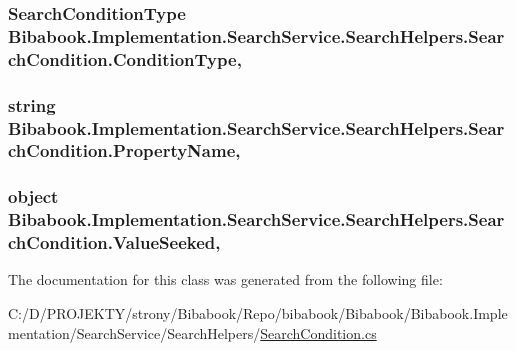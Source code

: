 \subsubsection[{Condition\+Type}]{\setlength{\rightskip}{0pt plus 5cm}Search\+Condition\+Type Bibabook.\+Implementation.\+Search\+Service.\+Search\+Helpers.\+Search\+Condition.\+Condition\+Type\hspace{0.3cm}{\ttfamily [get]}, {\ttfamily [set]}}\label{class_bibabook_1_1_implementation_1_1_search_service_1_1_search_helpers_1_1_search_condition_ad687a38f2ac1b652ba4f621fa3bbd983}
\hypertarget{class_bibabook_1_1_implementation_1_1_search_service_1_1_search_helpers_1_1_search_condition_a27ffc146a7b383bc22fddd9038b19535}{}
\subsubsection[{Property\+Name}]{\setlength{\rightskip}{0pt plus 5cm}string Bibabook.\+Implementation.\+Search\+Service.\+Search\+Helpers.\+Search\+Condition.\+Property\+Name\hspace{0.3cm}{\ttfamily [get]}, {\ttfamily [set]}}\label{class_bibabook_1_1_implementation_1_1_search_service_1_1_search_helpers_1_1_search_condition_a27ffc146a7b383bc22fddd9038b19535}
\hypertarget{class_bibabook_1_1_implementation_1_1_search_service_1_1_search_helpers_1_1_search_condition_a03fb0b6daa71f2dc653180d8618bf4ae}{}
\subsubsection[{Value\+Seeked}]{\setlength{\rightskip}{0pt plus 5cm}object Bibabook.\+Implementation.\+Search\+Service.\+Search\+Helpers.\+Search\+Condition.\+Value\+Seeked\hspace{0.3cm}{\ttfamily [get]}, {\ttfamily [set]}}\label{class_bibabook_1_1_implementation_1_1_search_service_1_1_search_helpers_1_1_search_condition_a03fb0b6daa71f2dc653180d8618bf4ae}


The documentation for this class was generated from the following file\+:\begin{DoxyCompactItemize}
\item 
C\+:/\+D/\+P\+R\+O\+J\+E\+K\+T\+Y/strony/\+Bibabook/\+Repo/bibabook/\+Bibabook/\+Bibabook.\+Implementation/\+Search\+Service/\+Search\+Helpers/\hyperlink{_search_condition_8cs}{Search\+Condition.\+cs}\end{DoxyCompactItemize}
